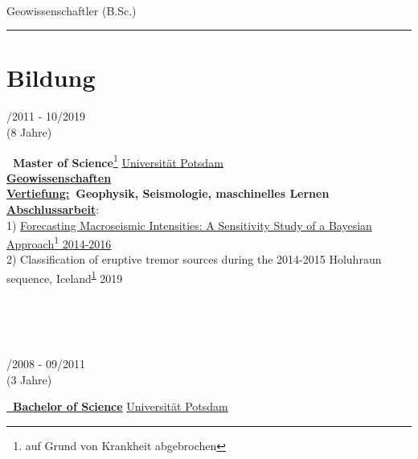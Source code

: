 \documentclass{article}
\begin{document}
\begin{minipage}[t]{0.69\textwidth}
\vspace{0pt}
	{\fontsize{30pt}{62pt}\color{gray} }\\
	{\fontsize{14pt}{24pt}\color{pblue} \selectfont Geowissenschaftler \color{lightgray} (B.Sc.)}\\
	\hrule
	\section*{\fontsize{18pt}{24pt}\selectfont \color{pblue} Bildung}
	\begin{minipage}[t]{0.2\textwidth}
			/2011 - 10/2019\\(8 Jahre)
		\end{minipage}
		\hfill
		\begin{minipage}[t]{0.75\textwidth}
		\textbf{\color{pblue}\faHourglassHalf~Master of Science}\footnote{\label{1} auf Grund von Krankheit abgebrochen}\hfill
		\href{https://www.uni-potsdam.de/}{\color{pblue}Universität Potsdam} \\
		\textbf{\underline{Geowissenschaften}}\\
		\textbf{\underline{Vertiefung:}~Geophysik, Seismologie, maschinelles Lernen}\\
		\textbf{\underline{Abschlussarbeit}}:\\ 1) \href{https://github.com/silvioschwarz/master-thesis}{Forecasting Macroseismic Intensities: A Sensitivity Study of a Bayesian Approach\textsuperscript{\ref{1}} 2014-2016} \\
		2) Classification of eruptive tremor sources during the 2014-2015 Holuhraun sequence, Iceland\textsuperscript{\ref{1}} 2019
	\end{minipage}\\\\\\
	\hfill
	\begin{minipage}[t]{0.2\textwidth}
			/2008 - 09/2011\\(3 Jahre)
		\end{minipage}
		\hfill
		\begin{minipage}[t]{0.75\textwidth}
		\textbf{\href{https://www.dropbox.com/s/297g1chiby8mrd3/Bachelor-Certificate.pdf?dl=0}{\color{pblue}\faGraduationCap~Bachelor of Science}} \hfill	\href{https://www.uni-potsdam.de/}{\color{pblue}Universität Potsdam}\\

\end{minipage}
\end{minipage}
\end{document}
